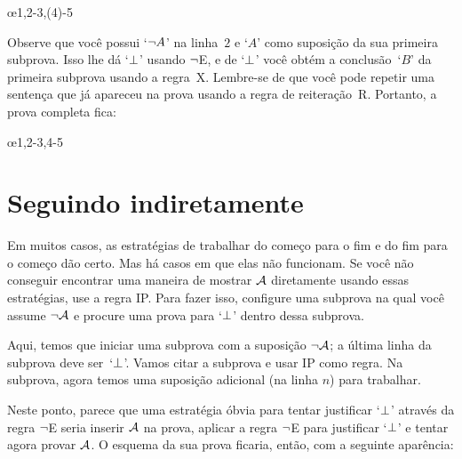 \begin{fitchproof}
	\open
	\ellipsesline 
	\close 
	\open
	\ellipsesline
	\close
	\oe{1,2-3,(4)-5} 
\end{fitchproof} 
Observe que você possui   `$\neg A$' na linha~$2$ e `$A$' como suposição da sua primeira subprova. Isso lhe dá  `$\bot$'  usando $\neg$E, e de `$\bot$' você obtém a conclusão~`$B$' da primeira subprova usando a regra~X. Lembre-se de que você pode repetir uma sentença que já apareceu na prova  usando a regra de reiteração~R. Portanto, a prova completa fica:
\begin{fitchproof}
	\open
	\close 
	\open
	\close
	\oe{1,2-3,4-5} 
\end{fitchproof} 
\section{Seguindo indiretamente}

Em muitos casos, as estratégias de trabalhar do começo para o fim  e do fim para o começo dão certo. Mas há casos em que elas não funcionam. Se você não conseguir encontrar uma maneira de mostrar $\mathcal{A}$ diretamente usando essas estratégias,  use a regra IP. Para fazer isso, configure uma subprova na qual você assume  $\neg\mathcal{A}$  e procure uma prova para `$\bot$' dentro dessa subprova.

\begin{fitchproof}
\open
{}
\ellipsesline 
{}
\close
{}
\end{fitchproof}
Aqui, temos que iniciar uma subprova com a suposição $\neg \mathcal{A}$;
a última linha da subprova deve ser~`$\bot$'. Vamos citar a subprova e usar  IP como regra. Na subprova, agora temos uma suposição adicional (na linha $n$) para trabalhar.
 

Neste ponto, parece que uma estratégia óbvia para tentar justificar  `$\bot$' através da regra $\neg$E seria inserir $\mathcal{A}$ na prova, aplicar a regra $\neg$E para justificar  `$\bot$' e tentar agora provar $\mathcal{A}$. O esquema da sua prova ficaria, então, com a seguinte aparência:


\begin{fitchproof}
\open
{}
\ellipsesline
{}
\close
{}
\end{fitchproof} 

